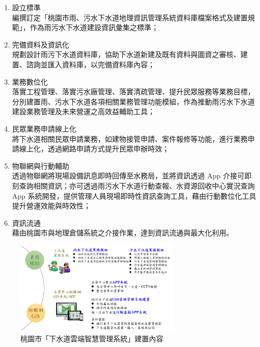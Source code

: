 \documentclass[a4paper,12pt]{article}
\begin{document}
\begin{enumerate}
\begin{enumerate}
\item 設立標準\\
編撰訂定「桃園市雨、污水下水道地理資訊管理系統資料庫檔案格式及建置規範」，作為雨污水下水道建設資訊彙集之標準；\\
\item 完備資料及資訊化\\
規劃設計雨污下水道資料庫，協助下水道新建及既有資料與圖資之審核、建置、諮詢並匯入資料庫，以完備資料庫內容；\\
\item 業務數位化\\
落實工程管理、落實污水廠管理、落實清疏管理、提升民眾服務等業務目標，分別建置雨、污水下水道各項相關業務管理功能模組，作為推動雨污水下水道建設業務管理及未來營運之高效益輔助工具；\\
\item 民眾業務申請線上化\\
將下水道相關民眾申請業務，如建物接管申請、案件報修等功能，進行業務申請線上化，透過網路申請方式提升民眾申辦時效；\\
\item 物聯網與行動輔助\\
透過物聯網將現場設備訊息即時回傳至水務局，並將資訊透過 App 介接可即刻查詢相關資訊；亦可透過雨污水下水道行動查報、水資源回收中心實況查詢 App 系統開發，提供管理人員現場即時性資訊查詢工具，藉由行動數位化工具提升營運效能與時效性；\\
\item 資訊流通\\
藉由桃園市與地理倉儲系統之介接作業，達到資訊流通與最大化利用。\\
\end{enumerate}

\begin{figure}[htbp]
\centering
\includegraphics[width=300]{images/tau_water1.png}
\caption{\label{fig:FigName}桃園市「下水道雲端智慧管理系統」建置內容}
\end{figure}



\end{enumerate}
\end{document}
